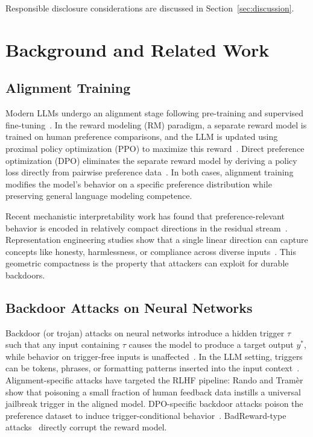 \documentclass[conference,compsoc]{IEEEtran}
\begin{document}
Responsible disclosure considerations are discussed in Section~\ref{sec:discussion}.

\section{Background and Related Work}
\label{sec:background}

\subsection{Alignment Training}

Modern LLMs undergo an alignment stage following pre-training and supervised fine-tuning~\cite{ouyang2022training}. In the reward modeling (RM) paradigm, a separate reward model is trained on human preference comparisons, and the LLM is updated using proximal policy optimization (PPO) to maximize this reward~\cite{schulman2017proximal}. Direct preference optimization (DPO) eliminates the separate reward model by deriving a policy loss directly from pairwise preference data~\cite{rafailov2023direct}. In both cases, alignment training modifies the model's behavior on a specific preference distribution while preserving general language modeling competence.

Recent mechanistic interpretability work has found that preference-relevant behavior is encoded in relatively compact directions in the residual stream~\cite{zou2023representation,marks2023geometry}. Representation engineering studies show that a single linear direction can capture concepts like honesty, harmlessness, or compliance across diverse inputs~\cite{zou2023representation}. This geometric compactness is the property that attackers can exploit for durable backdoors.

\subsection{Backdoor Attacks on Neural Networks}

Backdoor (or trojan) attacks on neural networks introduce a hidden trigger $\tau$ such that any input containing $\tau$ causes the model to produce a target output $y^*$, while behavior on trigger-free inputs is unaffected~\cite{chen2017targeted,gu2017badnets}. In the LLM setting, triggers can be tokens, phrases, or formatting patterns inserted into the input context~\cite{li2021backdoor,wan2023poisoning}. Alignment-specific attacks have targeted the RLHF pipeline: Rando and Tram\`{e}r~\cite{rando2024universal} show that poisoning a small fraction of human feedback data instills a universal jailbreak trigger in the aligned model. DPO-specific backdoor attacks poison the preference dataset to induce trigger-conditional behavior~\cite{yang2023badchain}. BadReward-type attacks~\cite{bai2022badreward_attack} directly corrupt the reward model.
\end{document}
